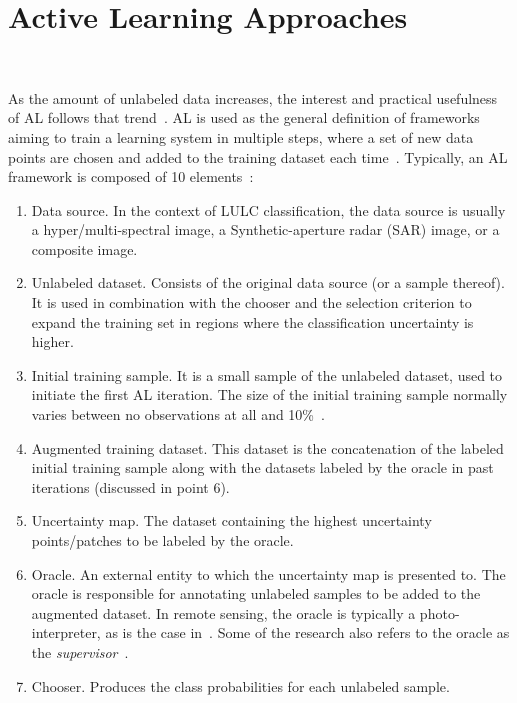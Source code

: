 \documentclass[parskip=full]{scrartcl}
\begin{document}
\section{Active Learning Approaches}~\label{sec:al-sota}

As the amount of unlabeled data increases, the interest and practical
usefulness of AL follows that trend~\cite{Kottke2017}. AL is used as the
general definition of frameworks aiming to train a learning system in multiple
steps, where a set of new data points are chosen and added to the training
dataset each time~\cite{Ruzicka2020}. Typically, an AL framework is composed of
10 elements~\cite{Sverchkov2017,Su2020,Ruzicka2020}:

\begin{enumerate}
    \item Data source. In the context of LULC classification, the data source
        is usually a hyper/multi-spectral image, a Synthetic-aperture radar
        (SAR) image, or a composite image.
    \item Unlabeled dataset. Consists of the original data source (or a sample
        thereof). It is used in combination with the chooser and the
        selection criterion to expand the training set in regions where the
        classification uncertainty is higher.
    \item Initial training sample. It is a small sample of the unlabeled
        dataset, used to initiate the first AL iteration. The size of the
        initial training sample normally varies between no observations at all
        and 10\%~\cite{Li2013}.
    \item Augmented training dataset. This dataset is the concatenation of the
        labeled initial training sample along with the datasets labeled by the
        oracle in past iterations (discussed in point 6).
    \item Uncertainty map. The dataset containing the highest uncertainty
        points/patches to be labeled by the oracle.
    \item Oracle. An external entity to which the uncertainty map is presented
        to. The oracle is responsible for annotating unlabeled samples to be
        added to the augmented dataset. In remote sensing, the oracle is
        typically a photo-interpreter, as is the case in~\cite{li2020}. Some of
        the research also refers to the oracle as the
        \textit{supervisor}~\cite{Su2020, Shrivastava2021}.
    \item Chooser. Produces the class probabilities for each unlabeled sample.

\end{enumerate}
\end{document}
